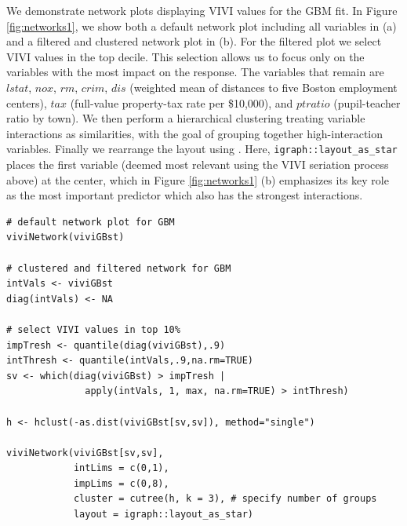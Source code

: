 We demonstrate network plots displaying VIVI values for the GBM fit. In Figure \ref{fig:networks1}, we show both a default network plot including all variables in (a) and a filtered and clustered network plot in (b). For the filtered plot we select VIVI values in the top decile. This selection allows us to focus only on the variables with the most impact on the response. The variables that remain are \(lstat\), \(nox\), \(rm\), \(crim\), \(dis\) (weighted mean of distances to five Boston employment centers), \(tax\) (full-value property-tax rate per \$10,000), and \(ptratio\) (pupil-teacher ratio by town). We then perform a hierarchical clustering treating variable interactions as similarities, with the goal of grouping together high-interaction variables. Finally we rearrange the layout using . Here, \texttt{igraph::layout\_as\_star} places the first variable (deemed most relevant using the VIVI seriation process above) at the center, which in Figure \ref{fig:networks1} (b) emphasizes its key role as the most important predictor which also has the strongest interactions.

\begin{verbatim}
# default network plot for GBM
viviNetwork(viviGBst)

# clustered and filtered network for GBM
intVals <- viviGBst
diag(intVals) <- NA 

# select VIVI values in top 10%
impTresh <- quantile(diag(viviGBst),.9)
intThresh <- quantile(intVals,.9,na.rm=TRUE)
sv <- which(diag(viviGBst) > impTresh |
              apply(intVals, 1, max, na.rm=TRUE) > intThresh)
              
h <- hclust(-as.dist(viviGBst[sv,sv]), method="single")

viviNetwork(viviGBst[sv,sv],
            intLims = c(0,1),
            impLims = c(0,8),
            cluster = cutree(h, k = 3), # specify number of groups
            layout = igraph::layout_as_star)
\end{verbatim}

